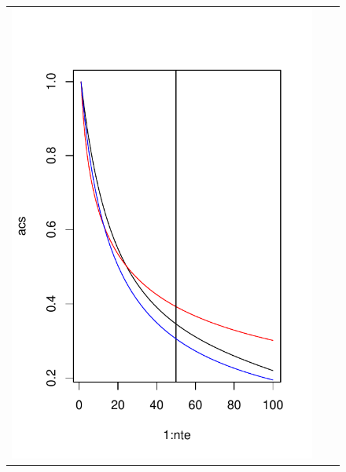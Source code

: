 \documentclass[12pt]{article}
\begin{document}
\begin{figure}
\begin{center}
\begin{tabular}{ccc}
\includegraphics[scale=0.4]{../info_theory_sims/fig_sim5a.pdf} &

\end{tabular}
\end{center}
\end{figure}
\end{document}
